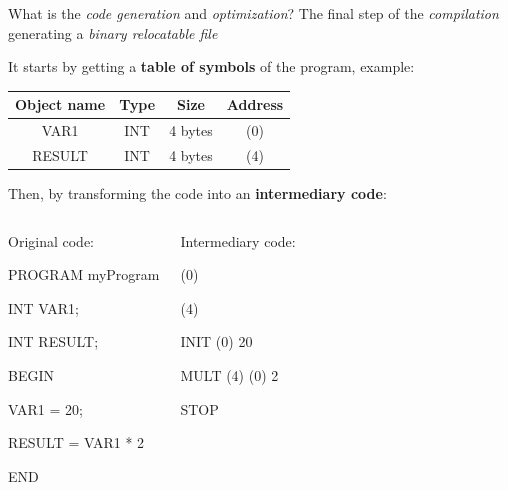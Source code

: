 \documentclass{beamer}[10pt, usepdftitle=false, handout]
\begin{document}
	\begin{frame}
	
	\begin{block}{What is the \textit{code generation} and \textit{optimization}?}	
	The final step of the \textit{compilation} generating a \textit{binary relocatable file}\footnotemark[3]
	\end{block}

	It starts by getting a \textbf{table of symbols} of the program, example:
	\begin{center}
	\begin{tabular}{|c|c|c|c|}
	\hline
	Object name & Type & Size & Address \\ \hline
	VAR1 & INT & 4 bytes & (0) \\ \hline
	RESULT & INT & 4 bytes & (4) \\ \hline
	\end{tabular}	
	\end{center}	
	
	Then, by transforming the code into an \textbf{intermediary code}:
	\vspace*{1em}	
	
	\begin{columns}[c]
	\begin{tiny}
	
	Original code:
	\vspace*{0.5em}	
	
	PROGRAM myProgram
	
	INT VAR1;
		
	INT RESULT;	
	
	BEGIN	
	
	VAR1 = 20;
	
	RESULT = VAR1 * 2
	
	END	
	
	\end{tiny}
	\column{.5\textwidth}
	\begin{tiny}
	Intermediary code:
	\vspace*{.5em}
	
	(0)
	
	(4)
	
	INIT (0) 20
	
	MULT (4) (0) 2
	
	STOP 
	
	\end{tiny}
	\end{columns}
			
	\end{frame}
	
\end{document}
